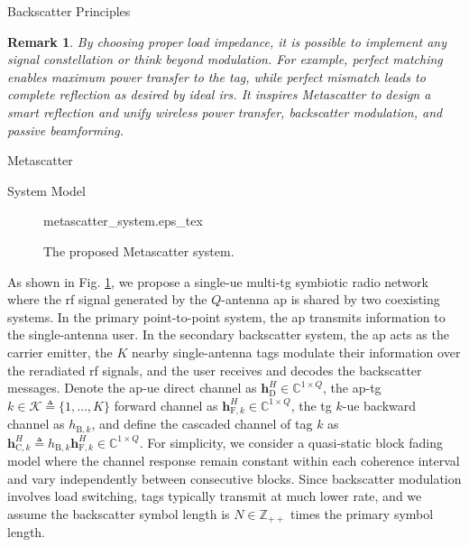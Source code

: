\documentclass[journal]{IEEEtran}
\newtheorem{remark}{Remark}
\begin{document}
\begin{section}{Backscatter Principles}
	\begin{remark}
		By choosing proper load impedance, it is possible to implement any signal constellation or think beyond modulation.
		For example, perfect matching enables maximum power transfer to the tag, while perfect mismatch leads to complete reflection as desired by ideal \gls{irs}.
		It inspires Metascatter to design a smart reflection and unify wireless power transfer, backscatter modulation, and passive beamforming.
	\end{remark}
\end{section}

\begin{section}{Metascatter}
	\begin{subsection}{System Model}
		\begin{figure}[!t]
			\centering
			\def\svgwidth{0.9\columnwidth}
			{metascatter_system.eps_tex}
			\caption{The proposed Metascatter system.}
			\label{fi:metascatter_system}
		\end{figure}
		As shown in Fig. \ref{fi:metascatter_system}, we propose a single-\gls{ue} multi-\gls{tg} symbiotic radio network where the \gls{rf} signal generated by the $Q$-antenna \gls{ap} is shared by two coexisting systems.
		In the primary point-to-point system, the \gls{ap} transmits information to the single-antenna user.
		In the secondary backscatter system, the \gls{ap} acts as the carrier emitter, the $K$ nearby single-antenna tags modulate their information over the reradiated \gls{rf} signals, and the user receives and decodes the backscatter messages.
		Denote the \gls{ap}-\gls{ue} direct channel as $\boldsymbol{h}_{\mathrm{D}}^H \in \mathbb{C}^{1 \times Q}$, the \gls{ap}-\gls{tg} $k \in \mathcal{K} \triangleq \{1,\ldots,K\}$ forward channel as $\boldsymbol{h}_{\mathrm{F},k}^H \in \mathbb{C}^{1 \times Q}$, the \gls{tg} $k$-\gls{ue} backward channel as $h_{\mathrm{B},k}$, and define the cascaded channel of tag $k$ as $\boldsymbol{h}_{\mathrm{C},k}^H \triangleq h_{\mathrm{B},k} \boldsymbol{h}_{\mathrm{F},k}^H \in \mathbb{C}^{1 \times Q}$.
		For simplicity, we consider a quasi-static block fading model where the channel response remain constant within each coherence interval and vary independently between consecutive blocks.
		Since backscatter modulation involves load switching, tags typically transmit at much lower rate, and we assume the backscatter symbol length is $N \in \mathbb{Z}_{++}$ times the primary symbol length.

\end{subsection}
\end{section}
\end{document}
